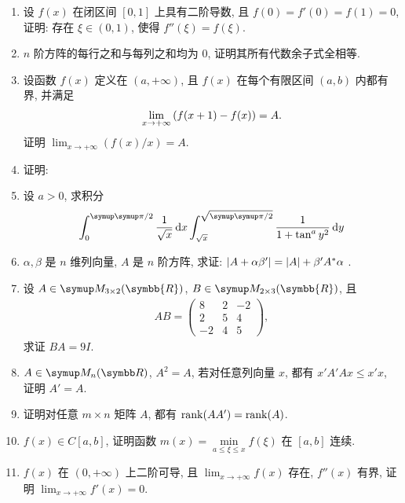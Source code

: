 \documentclass{ctexart}
\let\umathpi\pi
\renewcommand\pi{\symup\umathpi}%
\let\set\qty
\let\le\leqslant
\newcommand{\limit}[2]{\lim_{#1 \to #2}}
\newcommand{\me}{\symrm{e}}
\newcommand{\R}{\ensuremath{\symbb{R}}}
\begin{document}
\begin{enumerate}[series=exer]
    \item 设 $ f(x) $ 在闭区间 $ [0, 1] $ 上具有二阶导数, 且 $ f(0) = f'(0) = f(1) = 0 $, 证明: 存在 $ \xi \in (0, 1) $, 使得 $ f''(\xi) = f(\xi) $.
    \item $ n $ 阶方阵的每行之和与每列之和均为 0, 证明其所有代数余子式全相等.
    \item 设函数 $ f(x) $ 定义在 $ (a, +\infty) $, 且 $ f(x) $ 在每个有限区间 $ (a, b) $ 内都有界, 并满足
    \begin{align*}
        \limit{x}{+\infty} \qty(f(x + 1) - f(x)) = A.
    \end{align*}
    证明 $ \limit{x}{+\infty} (f(x) / x) = A $. 
    \item 证明: 
    \item 设 $ a > 0 $, 求积分
    \begin{align*}
        \int_{0}^{\pi/2} \frac{1}{\sqrt{x}} \dd{x} \int_{\sqrt{x}}^{\sqrt{\pi/2}} \frac{1}{1 + \tan^{a}y^{2}} \dd{y}
    \end{align*}
    \item $ \alpha, \beta $ 是 $ n $ 维列向量, $ A $ 是 $ n $ 阶方阵, 求证: $ \abs{A + \alpha\beta'} = \abs{A} + \beta'A^{*}\alpha $ . 
    \item 设 $ A \in \MM[\R][3\times 2] $, $ B \in \MM[\R][2 \times 3] $, 且
    \begin{align*}
        AB = \begin{pmatrix}
            8 & 2 & -2 \\
            2 & 5 & 4 \\
            -2 & 4 & 5
        \end{pmatrix},
    \end{align*}
    求证 $ BA = 9 I $. 
    \item $ A \in \MM $, $ A^{2} = A $, 若对任意列向量 $ x $, 都有 $ x'A'Ax \le x'x $, 证明 $ A' = A $.    
    \item 证明对任意 $ m \times n $ 矩阵 $ A $, 都有 $ \rank(AA') = \rank(A) $.  
    \item $ f(x) \in C[a, b] $, 证明函数 $ m(x) = \min\limits_{a \le \xi \le x}f(\xi) $ 在 $ [a, b] $ 连续.
    \item $ f(x) $ 在 $ (0, +\infty) $ 上二阶可导, 且 $ \limit{x}{+\infty} f(x) $ 存在, $ f''(x) $ 有界, 证明 $ \limit{x}{+\infty} f'(x) = 0 $.

\end{enumerate}
\end{document}
